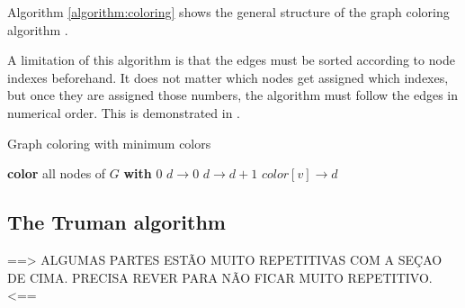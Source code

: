 \documentclass[conference]{IEEEtran}
\begin{document}
Algorithm \autoref{algorithm:coloring} shows the general structure of the graph coloring algorithm  \cite{mittal2011graph} \cite{vernize2013dissertation}.

A limitation of this algorithm is that the edges must be sorted according to node indexes beforehand.
It does not matter which nodes get assigned which indexes, but once they are assigned those numbers, the algorithm must follow the edges in numerical order.
This is demonstrated in \cite{vernize2013dissertation}.

\begin{algorithm}
\caption{Graph coloring with minimum colors}\label{algorithm:coloring}
\begin{algorithmic}[1]


\State \textbf{color} all nodes of $G$ \textbf{with} 0
\State $d \rightarrow 0$
			\State $d \rightarrow d+1$
		\EndIf
		\State $color[v] \rightarrow d$
	\EndIf
\EndFor


\EndFunction
\end{algorithmic}
\end{algorithm}

\subsection{The Truman algorithm}
\label{section:trustmanagement}



==> ALGUMAS PARTES ESTÃO MUITO REPETITIVAS COM A SEÇAO DE CIMA. PRECISA REVER PARA NÃO FICAR MUITO REPETITIVO. <==
\end{document}
